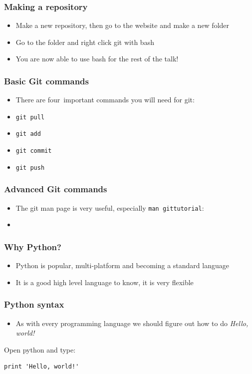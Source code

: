 \documentclass{beamer}
\begin{document}
\begin{frame}
\frametitle{Making a repository}
\begin{itemize}
\item Make a new repository, then go to the website and make a new folder 
\item Go to the folder and right click git with bash
\item You are now able to use bash for the rest of the talk!
\end{itemize}
\end{frame}


\begin{frame}
\frametitle{Basic Git commands}
\begin{itemize}
	\item There are four\footnotemark\ important commands you will need for git:
	\item \texttt{git pull}
	\item \texttt{git add}
	\item \texttt{git commit}
	\item \texttt{git push}
\end{itemize}
\end{frame}

\begin{frame}
\frametitle{Advanced Git commands}
\begin{itemize}
	\item The git man page is very useful, especially \texttt{man gittutorial}:
	\item 
\end{itemize}
\end{frame}


\begin{frame}
\frametitle{Why Python?} 
\begin{itemize}
	\item Python is popular, multi-platform and becoming a standard language\footnotemark\ 
	\item It is a good high level language to know, it is very flexible
\end{itemize}
\end{frame}

\begin{frame}
\frametitle{Python syntax} 
\begin{itemize}
	\item As with every programming language we should figure out how to do \textit{Hello, world!}
\end{itemize}
Open python and type:
\begin{verbatim}
print 'Hello, world!'
\end{verbatim}
\end{frame}
\end{document}

